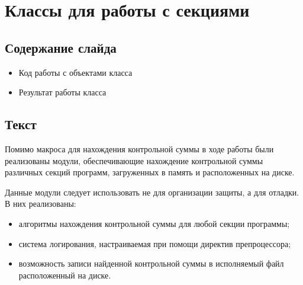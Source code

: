 
\section{Классы для работы с секциями}

\subsection{Содержание слайда}

\begin{itemize}
  \item Код работы с объектами класса
  \item Результат работы класса
\end{itemize}

\subsection{Текст}

Помимо макроса для нахождения контрольной суммы в ходе работы были реализованы
модули, обеспечивающие нахождение контрольной суммы различных секций программ,
загруженных в память и расположенных на диске.

Данные модули следует использовать не для организации защиты, а для отладки. В
них реализованы:
\begin{itemize}
  \item алгоритмы нахождения контрольной суммы для любой секции программы;
  \item система логирования, настраиваемая при помощи директив препроцессора;
  \item возможность записи найденной контрольной суммы в исполняемый файл
    расположенный на диске.
\end{itemize}
